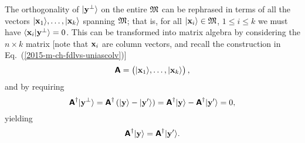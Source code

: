 The orthogonality of $\vert {\bf y}^\perp \rangle $ on the entire ${\frak M}$ can be rephrased in terms
of all the vectors $\vert {\bf x}_1 \rangle ,\ldots ,\vert {\bf x}_k \rangle $ spanning ${\frak M}$; that is,
for all $\vert {\bf x}_i \rangle  \in {\frak M}$, $1\le i\le k$
we must have
$\langle {\bf x}_i \vert {\bf y}^\perp \rangle = 0$.
This can be transformed into matrix algebra by considering the $n \times k$ matrix
[note that ${\bf x}_i$ are column vectors,
and recall the construction in Eq.~(\ref{2015-m-ch-fdlvs-uniascolv})]
\begin{equation}
\textsf{\textbf{A}} =
\begin{pmatrix}
\vert {\bf x}_1\rangle , \ldots , \vert {\bf x}_k \rangle
\end{pmatrix},
\end{equation}
and by requiring
\begin{equation}
\textsf{\textbf{A}}^\dagger \vert {\bf y}^\perp \rangle    =
 \textsf{\textbf{A}}^\dagger  \left(\vert {\bf y} \rangle - \vert {\bf y}' \rangle \right) =
 \textsf{\textbf{A}}^\dagger \vert {\bf y} \rangle   - \textsf{\textbf{A}}^\dagger \vert {\bf y}' \rangle    =
0,
\end{equation}
yielding
\begin{equation}
 \textsf{\textbf{A}}^\dagger  \vert  {\bf y}  \rangle
=
\textsf{\textbf{A}}^\dagger \vert {\bf y}' \rangle .
\label{2015-m-ch-cfvs-opab1}
\end{equation}

